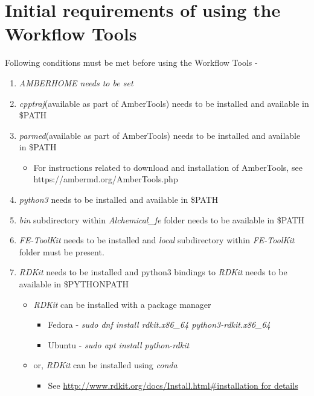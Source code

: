 \documentclass[11pt,letterpaper,titlepage]{article}
\begin{document}
\vspace{0.1cm}
\section{Initial requirements of using the Workflow Tools}
\vspace{0.1cm}

Following conditions must be met before using the Workflow Tools -
\renewcommand{\labelenumi}{\Roman{enumi}}
\begin{enumerate}
	\item {\textit{AMBERHOME needs to be set}}
	\item{\textit{cpptraj}(available as part of AmberTools) needs to be installed and available in \$PATH}
	\item{\textit{parmed}(available as part of AmberTools) needs to be installed and available in \$PATH}
		\begin{itemize}
			\item For instructions related to download and installation of AmberTools, see \\
				https://ambermd.org/AmberTools.php
		\end{itemize}
	\item{\textit{python3} needs to be installed and available in \$PATH}
	\item{\textit{bin} subdirectory within \textit{Alchemical\_fe} folder needs to be available in \$PATH}
	\item{\textit{FE-ToolKit} needs to be installed and \textit{local} subdirectory within \textit{FE-ToolKit} folder must be present.}
	\item{\textit{RDKit} needs to be installed and python3 bindings to \textit{RDKit} needs to be available in \$PYTHONPATH}
	\begin{itemize}
		\item{\textit{RDKit} can be installed with a package manager}
		\begin{itemize}
			\item{Fedora - \textit{sudo dnf install rdkit.x86\_64 python3-rdkit.x86\_64}}
			\item{Ubuntu - \textit{sudo apt install python-rdkit}}
		\end{itemize}
		\item{or, \textit{RDKit} can be installed using \textit{conda}}
		\begin{itemize}
			\item{See \url{http://www.rdkit.org/docs/Install.html\#installation for details}}
		\end{itemize}

\end{itemize}
\end{enumerate}
\end{document}
